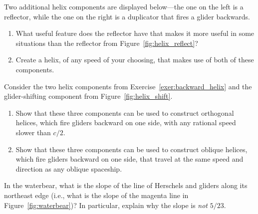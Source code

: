 \begin{multicols}{2}
\mfilbreak


\begin{problem}\label{exer:backward_helix} 
	Two additional helix components are displayed below---the one on the left is a reflector, while the one on the right is a duplicator that fires a glider backwards.
	
	\noindent\begin{center}
	\end{center}
	
	\begin{enumerate}[label=\bf\color{ocre}(\alph*)]
		\item What useful feature does the reflector have that makes it more useful in some situations than the reflector from Figure~\ref{fig:helix_reflect}?
		
		\item Create a helix, of any speed of your choosing, that makes use of both of these components.
	\end{enumerate}
\end{problem}


\mfilbreak


\begin{problem}\label{exer:backward_helix_universal} 
	Consider the two helix components from Exercise~\ref{exer:backward_helix} and the glider-shifting component from Figure~\ref{fig:helix_shift}.\smallskip
	
	\begin{enumerate}[label=\bf\color{ocre}(\alph*)]
		\item Show that these three components can be used to construct orthogonal helices, which fire gliders backward on one side, with any rational speed slower than $c/2$.
		
		\item Show that these three components can be used to construct oblique helices, which fire gliders backward on one side, that travel at the same speed and direction as any oblique spaceship.
	\end{enumerate}
\end{problem}


\mfilbreak


\begin{problemstar}\label{exer:waterbear_what_slope} 
	In the waterbear, what is the slope of the line of Herschels and gliders along its northeast edge (i.e., what is the slope of the magenta line in Figure~\ref{fig:waterbear})? In particular, explain why the slope is \emph{not} $5/23$.
\end{problemstar}



\end{multicols}
